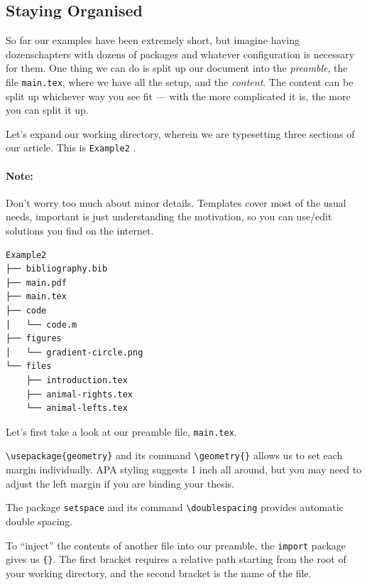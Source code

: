 \subsection{Staying Organised}
So far our examples have been extremely short, but imagine having dozenschapters with dozens of packages and whatever configuration is necessary for them.
One thing we can do is split up our document into the \emph{preamble}, the file \verb|main.tex|, where we have all the setup, and the \emph{content}.
The content can be split up whichever way you see fit --- with the more complicated it is, the more you can split it up. 

Let's expand our working directory, wherein we are typesetting three sections of our article. This is \verb|Example2| .

\paragraph{Note:}
Don't worry too much about minor details.
Templates cover most of the usual needs, important is just understanding the motivation, so you can use/edit solutions you find on the internet.
\begin{verbatim}
Example2
├── bibliography.bib
├── main.pdf
├── main.tex
├── code
│   └── code.m
├── figures
│   └── gradient-circle.png
└── files
    ├── introduction.tex
    ├── animal-rights.tex
    └── animal-lefts.tex
\end{verbatim}

Let's first take a look at our preamble file, \verb|main.tex|.


\verb|\usepackage{geometry}| and its command \verb|\geometry{}| allows us to set each margin individually.
APA styling suggests 1 inch all around, but you may need to adjust the left margin if you are binding your thesis.

The package \verb|setspace| and its command \verb|\doublespacing| provides automatic double spacing.

To ``inject'' the contents of another file into our preamble, the \verb|import| package gives us \verb|{}|.
The first bracket requires a relative path starting from the root of your working directory, and the second bracket is the name of the file.

